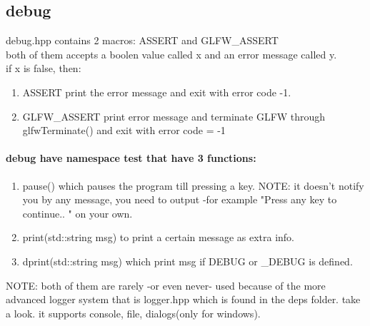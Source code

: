 \subsection{debug}
debug.hpp contains 2 macros: ASSERT and GLFW\_ASSERT \\
both of them accepts a boolen value called x and an error message called y.\\
if x is false, then:\\
\begin{enumerate}
  \item {ASSERT print the error message and exit with error code -1.} 
  \item {GLFW\_ASSERT print error message and terminate GLFW through glfwTerminate() and exit with error code = -1}
\end{enumerate}


\paragraph{debug have namespace test that have 3 functions:}
\begin{enumerate}{}
  \item {pause() which pauses the program till pressing a key. NOTE: it doesn't notify you by any message, you need to output -for example "Press any key to continue.. " on your own.}
  \item {print(std::string msg) to print a certain message as extra info.}
  \item {dprint(std::string msg) which print msg if DEBUG or \_DEBUG is defined.}
\end{enumerate}
NOTE: both of them are rarely -or even never- used because of the more advanced logger system that is logger.hpp which is found in the deps folder. take a look. it supports console, file, dialogs(only for windows).

